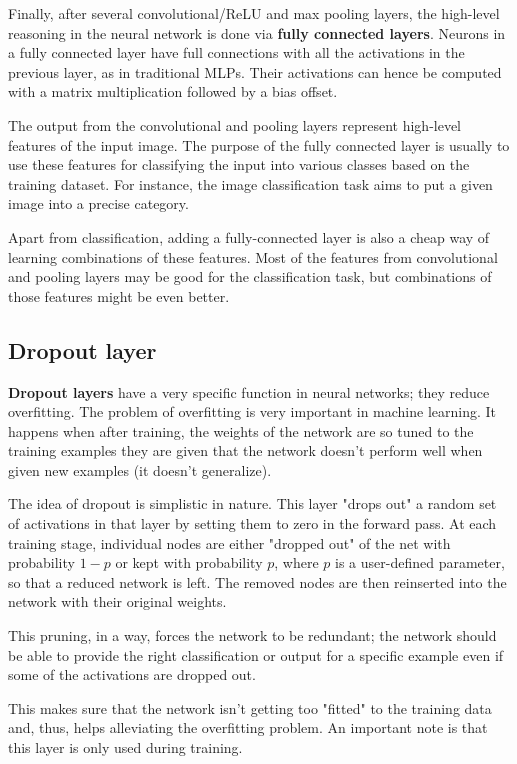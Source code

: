 Finally, after several convolutional/\ac{ReLU} and max pooling layers, the high-level reasoning in the neural network is done via \textbf{fully connected layers}. Neurons in a fully connected layer have full connections with all the activations in the previous layer, as in traditional \acsp{MLP}. Their activations can hence be computed with a matrix multiplication followed by a bias offset.

The output from the convolutional and pooling layers represent high-level features of the input image. The purpose of the fully connected layer is usually to use these features for classifying the input into various classes based on the training dataset. For instance, the image classification task aims to put a given image into a precise category.

Apart from classification, adding a fully-connected layer is also a cheap way of learning combinations of these features. Most of the features from convolutional and pooling layers may be good for the classification task, but combinations of those features might be even better.

\subsection{Dropout layer}

\textbf{Dropout layers} have a very specific function in neural networks; they reduce overfitting. The problem of overfitting is very important in machine learning. It happens when after training, the weights of the network are so tuned to the training examples they are given that the network doesn't perform well when given new examples (\ie it doesn't generalize).

The idea of dropout is simplistic in nature. This layer "drops out" a random set of activations in that layer by setting them to zero in the forward pass. At each training stage, individual nodes are either "dropped out" of the net with probability $1-p$ or kept with probability $p$, where $p$ is a user-defined parameter, so that a reduced network is left. The removed nodes are then reinserted into the network with their original weights.

This pruning, in a way, forces the network to be redundant; the network should be able to provide the right classification or output for a specific example even if some of the activations are dropped out.

This makes sure that the network isn’t getting too "fitted" to the training data and, thus, helps alleviating the overfitting problem. An important note is that this layer is only used during training.

